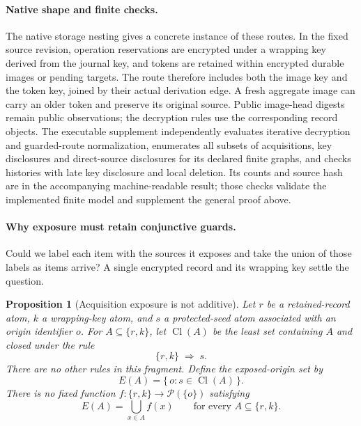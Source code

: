 \documentclass[pdflatex]{sn-jnl}
\theoremstyle{thmstyleone}
\newtheorem{proposition}[theorem]{Proposition}
\theoremstyle{thmstylethree}
\theoremstyle{thmstyletwo}
\begin{document}
\paragraph{Native shape and finite checks.}
The native storage nesting gives a concrete instance of these routes.
In the fixed source revision, operation reservations are encrypted under
a wrapping key derived from the journal key, and tokens are retained
within encrypted durable images or pending targets. The route therefore
includes both the image key and the token key, joined by their actual
derivation edge. A fresh aggregate image can carry an older token and
preserve its original source. Public image-head digests remain public
observations; the decryption rules use the corresponding record objects.
The executable supplement independently evaluates iterative decryption
and guarded-route normalization, enumerates all subsets of acquisitions,
key disclosures and direct-source disclosures for its declared finite graphs,
and checks histories with late
key disclosure and local deletion.  Its counts and source hash are in
the accompanying machine-readable result; those checks validate the
implemented finite model and supplement the general proof above.
\paragraph{Why exposure must retain conjunctive guards.}
Could we label each item with the sources it exposes and take the
union of those labels as items arrive? A single encrypted record and
its wrapping key settle the question.

\begin{proposition}[Acquisition exposure is not additive]
\label{prop:acquisition-nonadditivity}
Let $r$ be a retained-record atom, $k$ a wrapping-key atom, and $s$ a
protected-seed atom associated with an origin identifier $o$.
For $A\subseteq\{r,k\}$, let $\operatorname{Cl}(A)$ be the least set
containing $A$ and closed under the rule
\[
  \{r,k\}\;\Longrightarrow\;s.
\]
There are no other rules in this fragment.  Define the exposed-origin set by
\[
  E(A)=\{\,o : s\in\operatorname{Cl}(A)\,\}.
\]
There is no fixed function
$f:\{r,k\}\longrightarrow\mathcal{P}(\{o\})$ satisfying
\[
  E(A)=\bigcup_{x\in A} f(x)
  \qquad\text{for every }A\subseteq\{r,k\}.
\]
\end{proposition}
\end{document}
